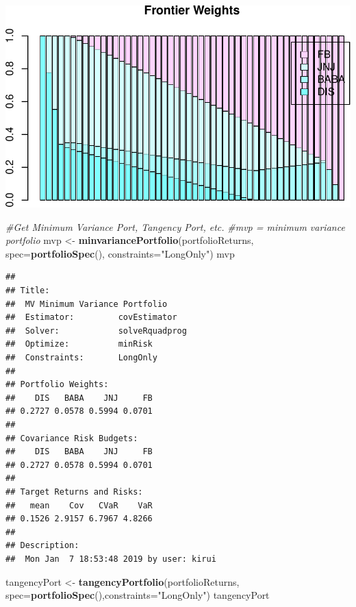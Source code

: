\documentclass[]{article}
\newenvironment{Shaded}{\begin{snugshade}}{\end{snugshade}}
\newcommand{\KeywordTok}[1]{\textcolor[rgb]{0.13,0.29,0.53}{\textbf{#1}}}
\newcommand{\DataTypeTok}[1]{\textcolor[rgb]{0.13,0.29,0.53}{#1}}
\newcommand{\StringTok}[1]{\textcolor[rgb]{0.31,0.60,0.02}{#1}}
\newcommand{\CommentTok}[1]{\textcolor[rgb]{0.56,0.35,0.01}{\textit{#1}}}
\newcommand{\NormalTok}[1]{#1}
\begin{document}
\includegraphics{Markowitz_Research_Me_files/figure-latex/unnamed-chunk-20-6.pdf}

\begin{Shaded}
\begin{Highlighting}[]
\CommentTok{#Get Minimum Variance Port, Tangency Port, etc.}
\CommentTok{#mvp = minimum variance portfolio}
\NormalTok{mvp <-}\StringTok{ }\KeywordTok{minvariancePortfolio}\NormalTok{(portfolioReturns,}
                            \DataTypeTok{spec=}\KeywordTok{portfolioSpec}\NormalTok{(), }\DataTypeTok{constraints=}\StringTok{"LongOnly"}\NormalTok{)}
\NormalTok{mvp}
\end{Highlighting}
\end{Shaded}

\begin{verbatim}
## 
## Title:
##  MV Minimum Variance Portfolio 
##  Estimator:         covEstimator 
##  Solver:            solveRquadprog 
##  Optimize:          minRisk 
##  Constraints:       LongOnly 
## 
## Portfolio Weights:
##    DIS   BABA    JNJ     FB 
## 0.2727 0.0578 0.5994 0.0701 
## 
## Covariance Risk Budgets:
##    DIS   BABA    JNJ     FB 
## 0.2727 0.0578 0.5994 0.0701 
## 
## Target Returns and Risks:
##   mean    Cov   CVaR    VaR 
## 0.1526 2.9157 6.7967 4.8266 
## 
## Description:
##  Mon Jan  7 18:53:48 2019 by user: kirui
\end{verbatim}

\begin{Shaded}
\begin{Highlighting}[]
\NormalTok{tangencyPort <-}\StringTok{ }\KeywordTok{tangencyPortfolio}\NormalTok{(portfolioReturns,}
                                  \DataTypeTok{spec=}\KeywordTok{portfolioSpec}\NormalTok{(),}\DataTypeTok{constraints=}\StringTok{"LongOnly"}\NormalTok{)}
\NormalTok{tangencyPort}
\end{Highlighting}
\end{Shaded}
\end{document}
